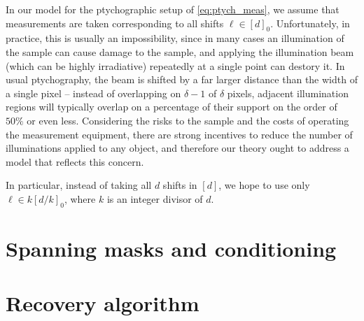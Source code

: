 In our model for the ptychographic setup of \eqref{eq:ptych_meas}, we assume that measurements are taken corresponding to all shifts $\ell \in [d]_0$.  Unfortunately, in practice, this is usually an impossibility, since in many cases an illumination of the sample can cause damage to the sample, and applying the illumination beam (which can be highly irradiative) repeatedly at a single point can destory it.  In usual ptychography, the beam is shifted by a far larger distance than the width of a single pixel -- instead of overlapping on $\delta - 1$ of $\delta$ pixels, adjacent illumination regions will typically overlap on a percentage of their support on the order of $50\%$ or even less.  Considering the risks to the sample and the costs of operating the measurement equipment, there are strong incentives to reduce the number of illuminations applied to any object, and therefore our theory ought to address a model that reflects this concern.

In particular, instead of taking all $d$ shifts in $[d]$, we hope to use only $\ell \in k [d / k]_0$, where $k$ is an integer divisor of $d$.

\section{Spanning masks and conditioning}

\label{sec:con_number_ptych}

\section{Recovery algorithm}

\label{sec:ptych_recovery}
